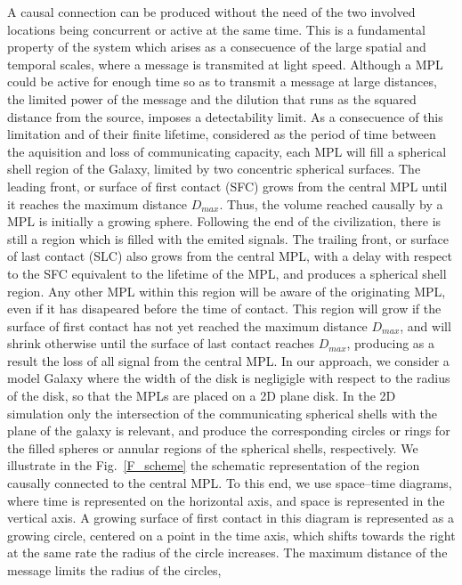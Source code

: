 A causal connection can be produced without the need of the two
involved locations being concurrent or active at the same time.
%
This is a fundamental property of the system which arises as a
consecuence of the large spatial and temporal scales, where a message
is transmited at light speed.
%
Although a MPL could be active for enough time so as to transmit a
message at large distances, the limited power of the message and the
dilution that runs as the squared distance from the source, imposes a
detectability limit.
%
As a consecuence of this limitation and of their finite lifetime,
considered as the period of time between the aquisition and loss of
communicating capacity, each MPL will fill a spherical shell region of
the Galaxy, limited by two concentric spherical surfaces.
%
The leading front, or surface of first contact (SFC) grows from the
central MPL until it reaches the maximum distance $D_{max}$.
%
Thus, the volume reached causally by a MPL is initially a growing
sphere.
%
Following the end of the civilization, there is still a region which
is filled with the emited signals.
%
The trailing front, or surface of last contact (SLC) also grows from
the central MPL, with a delay with respect to the SFC equivalent to
the lifetime of the MPL, and produces a spherical shell region.
%
Any other MPL within this region will be aware of the originating MPL,
even if it has disapeared before the time of contact.
%
This region will grow if the surface of first contact has not yet
reached the maximum distance $D_{max}$, and will shrink otherwise
until the surface of last contact reaches $D_{max}$, producing as a
result the loss of all signal from the central MPL.
%
In our approach, we consider a model Galaxy where the width of the
disk is negligigle with respect to the radius of the disk, so that the
MPLs are placed on a 2D plane disk.
%
In the 2D simulation only the intersection of the communicating
spherical shells with the plane of the galaxy is relevant, and produce
the corresponding circles or rings for the filled spheres or annular
regions of the spherical shells, respectively.
%
We illustrate in the Fig.~\ref{F_scheme} the schematic representation
of the region causally connected to the central MPL.
%
To this end, we use space--time diagrams, where time is represented on
the horizontal axis, and space is represented in the vertical axis.
%
A growing surface of first contact in this diagram is represented as a
growing circle, centered on a point in the time axis, which shifts
towards the right at the same rate the radius of the circle increases.
%
The maximum distance of the message limits the radius of the circles,
